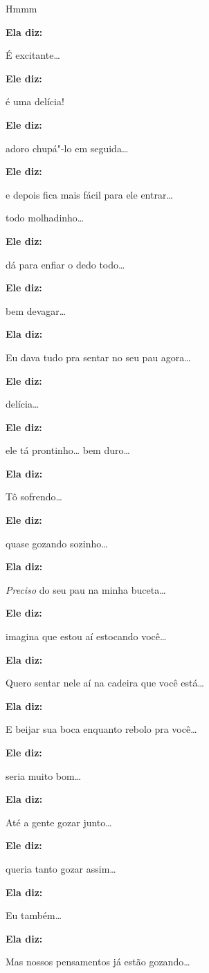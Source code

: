 Hmmm

\textbf{Ela diz:}

É excitante…

\textbf{Ele diz:}

é uma delícia!

\textbf{Ele diz:}

adoro chupá"-lo em seguida…

\textbf{Ele diz:}

e depois fica mais fácil para ele entrar…

todo molhadinho…

\textbf{Ele diz:}

dá para enfiar o dedo todo…

\textbf{Ele diz:}

bem devagar…

\textbf{Ela diz:}

Eu dava tudo pra sentar no seu pau agora…

\textbf{Ele diz:}

delícia…

\textbf{Ele diz:}

ele tá prontinho… bem duro…

\textbf{Ela diz:}

Tô sofrendo…

\textbf{Ele diz:}

quase gozando sozinho…

\textbf{Ela diz:}

\emph{Preciso} do seu pau na minha buceta…

\textbf{Ele diz:}

imagina que estou aí estocando você…

\textbf{Ela diz:}

Quero sentar nele aí na cadeira que você está…

\textbf{Ela diz:}

E beijar sua boca enquanto rebolo pra você…

\textbf{Ele diz:}

seria muito bom…

\textbf{Ela diz:}

Até a gente gozar junto…

\textbf{Ele diz:}

queria tanto gozar assim…

\textbf{Ela diz:}

Eu também…

\textbf{Ela diz:}

Mas nossos pensamentos já estão gozando…

